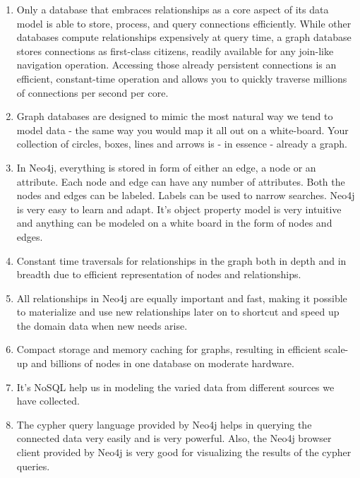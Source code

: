 \begin{enumerate}

\item Only a database that embraces relationships as a core aspect of its data model is able to store, process, and query connections efficiently. While other databases compute relationships expensively at query time, a graph database stores connections as first-class citizens, readily available for any join-like navigation operation. Accessing those already persistent connections is an efficient, constant-time operation and allows you to quickly traverse millions of connections per second per core. 

\item Graph databases are designed to mimic the most natural way we tend to model data - the same way you would map it all out on a white-board. Your collection of circles, boxes, lines and arrows is - in essence - already a graph. 

\item In Neo4j, everything is stored in form of either an edge, a node or an attribute. Each node and edge can have any number of attributes. Both the nodes and edges can be labeled. Labels can be used to narrow searches.  Neo4j is very easy to learn and adapt. It's object property model is very intuitive and anything can be modeled on a white board in the form of nodes and edges.

\item Constant time traversals for relationships in the graph both in depth and in breadth due to efficient representation of nodes and relationships.

\item All relationships in Neo4j are equally important and fast, making it possible to materialize and use new relationships later on to shortcut and speed up the domain data when new needs arise. 

\item Compact storage and memory caching for graphs, resulting in efficient scale-up and billions of nodes in one database on moderate hardware.

\item It's NoSQL help us in modeling the varied data from different sources we have collected.

\item The cypher query language provided by Neo4j helps in querying the connected data very easily and is very powerful. Also, the Neo4j browser client provided by Neo4j is very good for visualizing the results of the cypher queries.

\end{enumerate}

